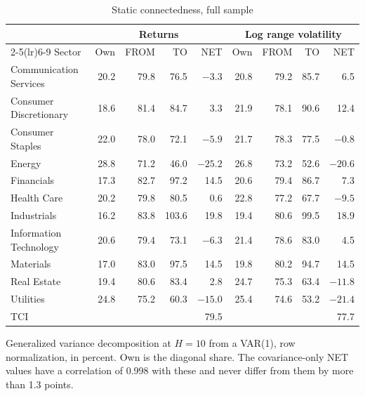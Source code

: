 \documentclass[11pt]{article}
\begin{document}
\begin{table}[H]
\centering
\caption{Static connectedness, full sample}
\label{tab:static}
\small
\begin{tabular}{lrrrrrrrr}
\toprule
& \multicolumn{4}{c}{Returns} & \multicolumn{4}{c}{Log range volatility} \\
\cmidrule(lr){2-5}\cmidrule(lr){6-9}
Sector & Own & FROM & TO & NET & Own & FROM & TO & NET \\
\midrule
Communication Services & 20.2 & 79.8 & 76.5 & $-3.3$ & 20.8 & 79.2 & 85.7 & 6.5 \\
Consumer Discretionary & 18.6 & 81.4 & 84.7 & 3.3 & 21.9 & 78.1 & 90.6 & 12.4 \\
Consumer Staples & 22.0 & 78.0 & 72.1 & $-5.9$ & 21.7 & 78.3 & 77.5 & $-0.8$ \\
Energy & 28.8 & 71.2 & 46.0 & $-25.2$ & 26.8 & 73.2 & 52.6 & $-20.6$ \\
Financials & 17.3 & 82.7 & 97.2 & 14.5 & 20.6 & 79.4 & 86.7 & 7.3 \\
Health Care & 20.2 & 79.8 & 80.5 & 0.6 & 22.8 & 77.2 & 67.7 & $-9.5$ \\
Industrials & 16.2 & 83.8 & 103.6 & 19.8 & 19.4 & 80.6 & 99.5 & 18.9 \\
Information Technology & 20.6 & 79.4 & 73.1 & $-6.3$ & 21.4 & 78.6 & 83.0 & 4.5 \\
Materials & 17.0 & 83.0 & 97.5 & 14.5 & 19.8 & 80.2 & 94.7 & 14.5 \\
Real Estate & 19.4 & 80.6 & 83.4 & 2.8 & 24.7 & 75.3 & 63.4 & $-11.8$ \\
Utilities & 24.8 & 75.2 & 60.3 & $-15.0$ & 25.4 & 74.6 & 53.2 & $-21.4$ \\
\midrule
TCI & \multicolumn{4}{r}{79.5} & \multicolumn{4}{r}{77.7} \\
\bottomrule
\end{tabular}

\smallskip
\parbox{0.95\textwidth}{\footnotesize Generalized variance decomposition at $H=10$ from a VAR(1), row normalization, in percent. Own is the diagonal share. The covariance-only NET values have a correlation of 0.998 with these and never differ from them by more than 1.3 points.}
\end{table}
\end{document}

